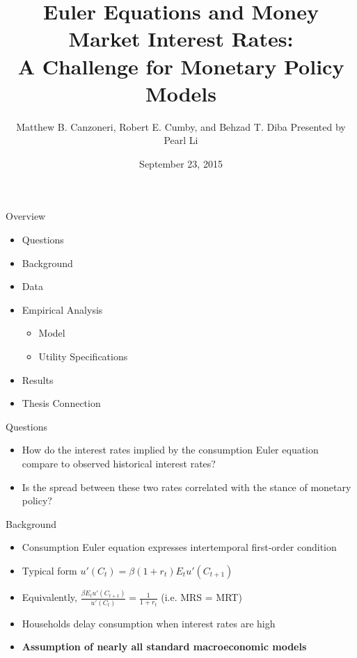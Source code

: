 \documentclass{beamer}
\title[Euler Equations]{Euler Equations and Money Market Interest Rates: \\ A Challenge for Monetary Policy Models}
\author[Canzoneri, Cumby \& Diba]{Matthew B. Canzoneri, Robert E. Cumby, and Behzad T. Diba
    Presented by Pearl Li}
\date{September 23, 2015}
\begin{document}
\begin{frame}
\titlepage
\end{frame}

\begin{frame}{Overview}
\begin{itemize}
\item Questions
\item Background
\item Data
\item Empirical Analysis
    \begin{itemize}
    \item Model
    \item Utility Specifications
    \end{itemize}
\item Results
\item Thesis Connection
\end{itemize}
\end{frame}

\begin{frame}{Questions}
\begin{itemize}
\item How do the interest rates implied by the consumption Euler equation compare to observed historical interest rates?
\item Is the spread between these two rates correlated with the stance of monetary policy?
\end{itemize}
\end{frame}

\begin{frame}{Background}
\begin{itemize}
\item Consumption Euler equation expresses intertemporal first-order condition
\item Typical form $u'(C_t) = \beta (1 + r_t) E_t u'(C_{t+1})$
\item Equivalently, $\frac{\beta E_t u'(C_{t+1})}{u'(C_t)} = \frac{1}{1+r_t}$ (i.e. MRS = MRT)
\item Households delay consumption when interest rates are high
\item \textbf{Assumption of nearly all standard macroeconomic models}
\end{itemize}
\end{frame}
\end{document}
